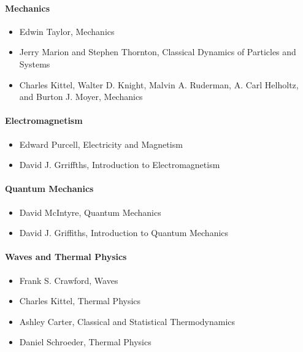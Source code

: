 \documentclass[letterpaper,10pt,english]{jupyterBook}
\begin{document}
\paragraph{Mechanics}
\label{\detokenize{content/0_course/design:mechanics}}\begin{itemize}
\item {} 
\sphinxAtStartPar
Edwin Taylor, Mechanics

\item {} 
\sphinxAtStartPar
Jerry Marion and Stephen Thornton, Classical Dynamics of Particles and Systems

\item {} 
\sphinxAtStartPar
Charles Kittel, Walter D. Knight, Malvin A. Ruderman, A. Carl Helholtz, and Burton J. Moyer, Mechanics

\end{itemize}


\paragraph{Electromagnetism}
\label{\detokenize{content/0_course/design:electromagnetism}}\begin{itemize}
\item {} 
\sphinxAtStartPar
Edward Purcell, Electricity and Magnetism

\item {} 
\sphinxAtStartPar
David J. Grriffths, Introduction to Electromagnetism

\end{itemize}


\paragraph{Quantum Mechanics}
\label{\detokenize{content/0_course/design:quantum-mechanics}}\begin{itemize}
\item {} 
\sphinxAtStartPar
David McIntyre, Quantum Mechanics

\item {} 
\sphinxAtStartPar
David J. Griffiths, Introduction to Quantum Mechanics

\end{itemize}


\paragraph{Waves and Thermal Physics}
\label{\detokenize{content/0_course/design:waves-and-thermal-physics}}\begin{itemize}
\item {} 
\sphinxAtStartPar
Frank S. Crawford, Waves

\item {} 
\sphinxAtStartPar
Charles Kittel, Thermal Physics

\item {} 
\sphinxAtStartPar
Ashley Carter, Classical and Statistical Thermodynamics

\item {} 
\sphinxAtStartPar
Daniel Schroeder, Thermal Physics

\end{itemize}
\end{document}
